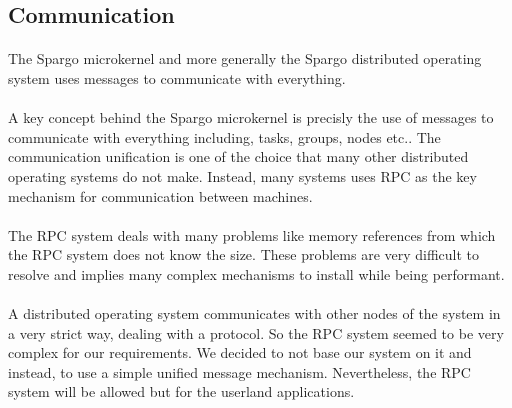 \documentclass[10pt,a4wide]{article}
\begin{document}
\begin{multicols}{2}
\begin{enumerate}
\end{enumerate}

\subsection{Communication}

\paragraph{}

The Spargo microkernel and more generally the Spargo distributed operating
system uses messages to communicate with everything.

\paragraph{}

A key concept behind the Spargo microkernel is precisly the use of messages
to communicate with everything including, tasks, groups, nodes etc..
The communication unification is one of the choice that many other distributed
operating systems do not make. Instead, many systems uses RPC as the key
mechanism for communication between machines.

\paragraph{}

The RPC system deals with many problems like memory references from which the
RPC system does not know the size. These problems are very difficult to
resolve and implies many complex mechanisms to install while being performant.

\paragraph{}

A distributed operating system communicates with other nodes of the system in
a very strict way, dealing with a protocol. So the RPC system seemed to be very
complex for our requirements. We decided to not base our system on it and
instead, to use a simple unified message mechanism. Nevertheless, the RPC
system will be allowed but for the userland applications.

\paragraph{}


\end{multicols}
\end{document}
